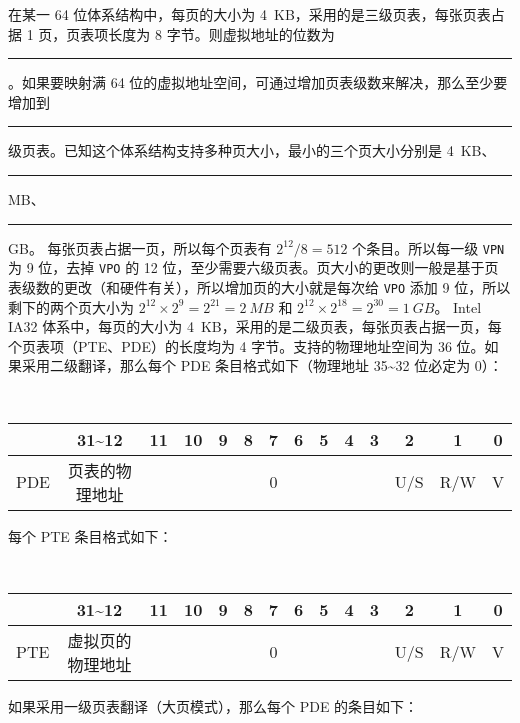     \begin{problems}
        \pro 在某一 64 位体系结构中，每页的大小为 \SI{4}{KB}，采用的是三级页表，每张页表占据 1 页，页表项长度为 8 字节。则虚拟地址的位数为 \rule{2.5cm}{0.25mm}。如果要映射满 64 位的虚拟地址空间，可通过增加页表级数来解决，那么至少要增加到 \rule{2.5cm}{0.25mm} 级页表。已知这个体系结构支持多种页大小，最小的三个页大小分别是 \SI{4}{KB}、\rule{2.5cm}{0.25mm} \si{MB}、\rule{2.5cm}{0.25mm} \si{GB}。
        \sol 每张页表占据一页，所以每个页表有 $2^{12}/8=512$ 个条目。所以每一级 \verb|VPN| 为 9 位，去掉 \verb|VPO| 的 12 位，至少需要六级页表。页大小的更改则一般是基于页表级数的更改（和硬件有关），所以增加页的大小就是每次给 \verb|VPO| 添加 9 位，所以剩下的两个页大小为 $2^{12} \times 2^9=2^{21} = \SI{2}{MB}$ 和 $2^{12} \times 2^{18}=2^{30} = \SI{1}{GB}$。
        \pro Intel IA32 体系中，每页的大小为 \SI{4}{KB}，采用的是二级页表，每张页表占据一页，每个页表项（PTE、PDE）的长度均为 4 字节。支持的物理地址空间为 36 位。如果采用二级翻译，那么每个 PDE 条目格式如下（物理地址 35\textasciitilde 32 位必定为 0）：
        \begin{table}[H]
            \tt
            \centering
            \begin{tabular}{|c|c|c|c|c|c|c|c|c|c|c|c|c|c|}
                \hline
                & 31\textasciitilde 12 & 11 & 10 & 9 & 8 & 7 & 6 & 5 & 4 & 3 & 2 & 1 & 0 \\ \hline
                PDE & 页表的物理地址 &  &  &  &  & 0 &  &  &  &  & U/S & R/W & V \\ \hline
            \end{tabular}
        \end{table}
        每个 PTE 条目格式如下：
        \begin{table}[H]
            \tt
            \centering
            \begin{tabular}{|c|c|c|c|c|c|c|c|c|c|c|c|c|c|}
                \hline
                & 31\textasciitilde 12 & 11 & 10 & 9 & 8 & 7 & 6 & 5 & 4 & 3 & 2 & 1 & 0 \\ \hline
                PTE & 虚拟页的物理地址 &  &  &  &  & 0 &  &  &  &  & U/S & R/W & V \\ \hline
            \end{tabular}
        \end{table}
        如果采用一级页表翻译（大页模式），那么每个 PDE 的条目如下：
        \begin{table}[H]
            \tt
            \centering
            \begin{tabular}{|c|c|c|c|c|c|c|c|c|c|c|c|c|}

\end{tabular}
\end{table}
\end{problems}
